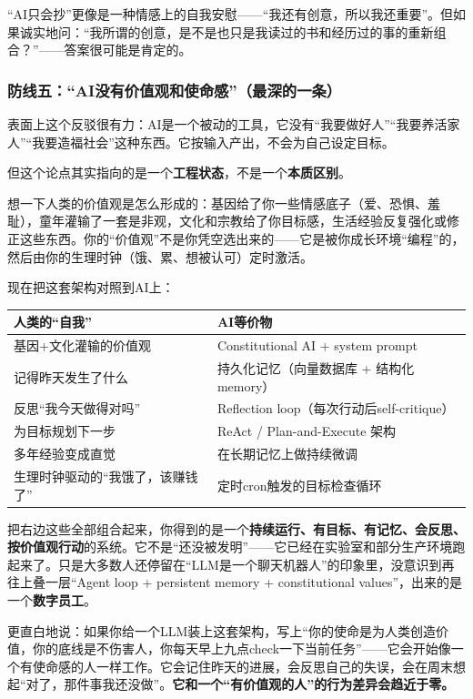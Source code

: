 \documentclass[11pt,a4paper]{ctexart}
\begin{document}
“AI只会抄”更像是一种情感上的自我安慰——“我还有创意，所以我还重要”。但如果诚实地问：“我所谓的创意，是不是也只是我读过的书和经历过的事的重新组合？”——答案很可能是肯定的。

\subsubsection{防线五：“AI没有价值观和使命感”（最深的一条）}

表面上这个反驳很有力：AI是一个被动的工具，它没有“我要做好人”“我要养活家人”“我要造福社会”这种东西。它按输入产出，不会为自己设定目标。

但这个论点其实指向的是一个\textbf{工程状态}，不是一个\textbf{本质区别}。

想一下人类的价值观是怎么形成的：基因给了你一些情感底子（爱、恐惧、羞耻），童年灌输了一套是非观，文化和宗教给了你目标感，生活经验反复强化或修正这些东西。你的“价值观”不是你凭空选出来的——它是被你成长环境“编程”的，然后由你的生理时钟（饿、累、想被认可）定时激活。

现在把这套架构对照到AI上：

\begin{center}

\begin{tabularx}{\textwidth}{lX}
\toprule
人类的“自我” & AI等价物 \\
\midrule
基因+文化灌输的价值观 & Constitutional AI + system prompt \\
记得昨天发生了什么 & 持久化记忆（向量数据库 + 结构化memory） \\
反思“我今天做得对吗” & Reflection loop（每次行动后self-critique） \\
为目标规划下一步 & ReAct / Plan-and-Execute 架构 \\
多年经验变成直觉 & 在长期记忆上做持续微调 \\
生理时钟驱动的“我饿了，该赚钱了” & 定时cron触发的目标检查循环 \\
\bottomrule
\end{tabularx}
\end{center}

把右边这些全部组合起来，你得到的是一个\textbf{持续运行、有目标、有记忆、会反思、按价值观行动}的系统。它不是“还没被发明”——它已经在实验室和部分生产环境跑起来了。只是大多数人还停留在“LLM是一个聊天机器人”的印象里，没意识到再往上叠一层“Agent loop + persistent memory + constitutional values”，出来的是一个\textbf{数字员工}。

更直白地说：如果你给一个LLM装上这套架构，写上“你的使命是为人类创造价值，你的底线是不伤害人，你每天早上九点check一下当前任务”——它会开始像一个有使命感的人一样工作。它会记住昨天的进展，会反思自己的失误，会在周末想起“对了，那件事我还没做”。\textbf{它和一个“有价值观的人”的行为差异会趋近于零。}
\end{document}
